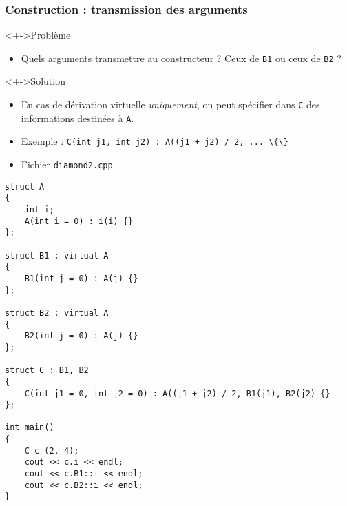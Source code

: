 \begin{frame}
\frametitle{Construction : transmission des arguments}
\begin{alertblock}<+->{Problème}
\begin{itemize}[<+->]
\item Quels arguments transmettre au constructeur ? Ceux de \texttt{B1} ou ceux de \texttt{B2} ?
\end{itemize}
\end{alertblock}
\begin{exampleblock}<+->{Solution}
\begin{itemize}[<+->]
\item En cas de dérivation virtuelle \emph{uniquement}, on peut spécifier dans \texttt{C} des informations destinées à \texttt{A}.
\end{itemize}
\end{exampleblock}
\begin{itemize}[<+->]
\item Exemple : \lstinline|C(int j1, int j2) : A((j1 + j2) / 2, ... \{\}|
\end{itemize}
\end{frame}

\begin{frame}[containsverbatim]
\begin{itemize}
\item Fichier \texttt{diamond2.cpp}
\end{itemize}
\begin{lstlisting}
struct A
{
	int i;
	A(int i = 0) : i(i) {}
};

struct B1 : virtual A
{
	B1(int j = 0) : A(j) {}
};

struct B2 : virtual A
{
	B2(int j = 0) : A(j) {}
};

struct C : B1, B2
{
	C(int j1 = 0, int j2 = 0) : A((j1 + j2) / 2, B1(j1), B2(j2) {}
};

int main()
{
	C c (2, 4);
	cout << c.i << endl;
	cout << c.B1::i << endl;
	cout << c.B2::i << endl;
}
\end{lstlisting}
\end{frame}

